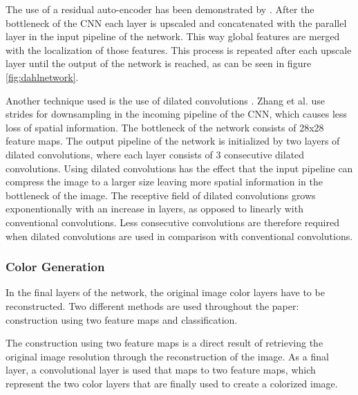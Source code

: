 The use of a residual auto-encoder has been demonstrated by \cite{Dahl}. After the bottleneck of the CNN each layer is upscaled and concatenated with the parallel layer in the input pipeline of the network. This way global features are merged with the localization of those features. This process is repeated after each upscale layer until the output of the network is reached, as can be seen in figure \ref{fig:dahlnetwork}.

%
Another technique used is the use of dilated convolutions \cite{yu2015multi}. Zhang et al. use strides for downsampling in the incoming pipeline of the CNN, which causes less loss of spatial information. The bottleneck of the network consists of 28x28 feature maps. The output pipeline of the network is initialized by two layers of dilated convolutions, where each layer consists of 3 consecutive dilated convolutions. Using dilated convolutions has the effect that the input pipeline can compress the image to a larger size leaving more spatial information in the bottleneck of the image. The receptive field of dilated convolutions grows exponentionally with an increase in layers, as opposed to linearly with conventional convolutions. Less consecutive convolutions are therefore required when dilated convolutions are used in comparison with conventional convolutions.\\


\subsubsection{Color Generation}
In the final layers of the network, the original image color layers have to be reconstructed. Two different methods are used throughout the paper: construction using two feature maps and classification.

The construction using two feature maps is a direct result of retrieving the original image resolution through the reconstruction of the image. As a final layer, a convolutional layer is used that maps to two feature maps, which represent the two color layers that are finally used to create a colorized image.

